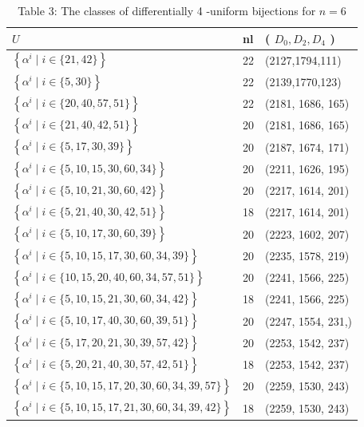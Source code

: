 \documentclass[10pt]{article}
\begin{document}
\begin{table}[h]
\begin{center}
\captionsetup{labelformat=empty}
\caption{Table 3: The classes of differentially 4 -uniform bijections for $n=6$}
\begin{tabular}{|l|l|l|}
\hline
$U$ & nl & ( $D_{0}, D_{2}, D_{4}$ ) \\
\hline
$\left\{\alpha^{i} \mid i \in\{21,42\}\right\}$ & 22 & (2127,1794,111) \\
\hline
$\left\{\alpha^{i} \mid i \in\{5,30\}\right\}$ & 22 & (2139,1770,123) \\
\hline
$\left\{\alpha^{i} \mid i \in\{20,40,57,51\}\right\}$ & 22 & (2181, 1686, 165) \\
\hline
$\left\{\alpha^{i} \mid i \in\{21,40,42,51\}\right\}$ & 20 & (2181, 1686, 165) \\
\hline
$\left\{\alpha^{i} \mid i \in\{5,17,30,39\}\right\}$ & 20 & (2187, 1674, 171) \\
\hline
$\left\{\alpha^{i} \mid i \in\{5,10,15,30,60,34\}\right\}$ & 20 & (2211, 1626, 195) \\
\hline
$\left\{\alpha^{i} \mid i \in\{5,10,21,30,60,42\}\right\}$ & 20 & (2217, 1614, 201) \\
\hline
$\left\{\alpha^{i} \mid i \in\{5,21,40,30,42,51\}\right\}$ & 18 & (2217, 1614, 201) \\
\hline
$\left\{\alpha^{i} \mid i \in\{5,10,17,30,60,39\}\right\}$ & 20 & (2223, 1602, 207) \\
\hline
$\left\{\alpha^{i} \mid i \in\{5,10,15,17,30,60,34,39\}\right\}$ & 20 & (2235, 1578, 219) \\
\hline
$\left\{\alpha^{i} \mid i \in\{10,15,20,40,60,34,57,51\}\right\}$ & 20 & (2241, 1566, 225) \\
\hline
$\left\{\alpha^{i} \mid i \in\{5,10,15,21,30,60,34,42\}\right\}$ & 18 & (2241, 1566, 225) \\
\hline
$\left\{\alpha^{i} \mid i \in\{5,10,17,40,30,60,39,51\}\right\}$ & 20 & (2247, 1554, 231,) \\
\hline
$\left\{\alpha^{i} \mid i \in\{5,17,20,21,30,39,57,42\}\right\}$ & 20 & (2253, 1542, 237) \\
\hline
$\left\{\alpha^{i} \mid i \in\{5,20,21,40,30,57,42,51\}\right\}$ & 18 & (2253, 1542, 237) \\
\hline
$\left\{\alpha^{i} \mid i \in\{5,10,15,17,20,30,60,34,39,57\}\right\}$ & 20 & (2259, 1530, 243) \\
\hline
$\left\{\alpha^{i} \mid i \in\{5,10,15,17,21,30,60,34,39,42\}\right\}$ & 18 & (2259, 1530, 243) \\

\end{tabular}
\end{center}
\end{table}
\end{document}
